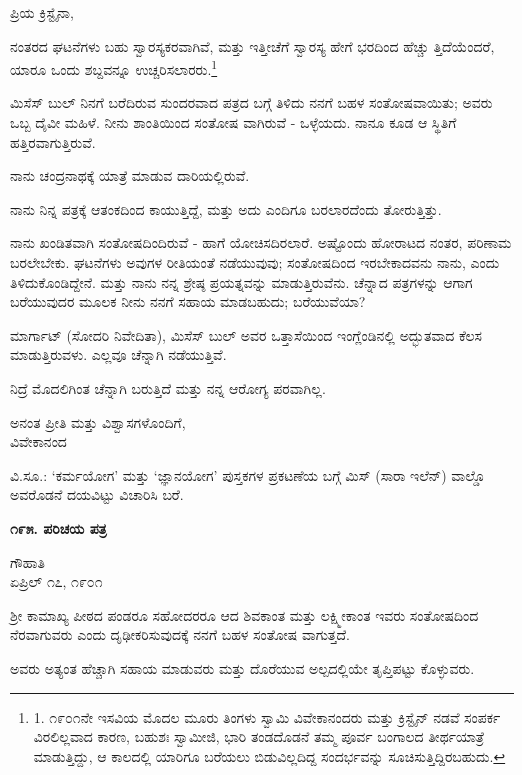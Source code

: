 ಪ್ರಿಯ ಕ್ರಿಸ್ಟೈನಾ,

ನಂತರದ ಘಟನೆಗಳು ಬಹು ಸ್ವಾರಸ್ಯಕರವಾಗಿವೆ, ಮತ್ತು ಇತ್ತೀಚೆಗೆ ಸ್ವಾರಸ್ಯ ಹೇಗೆ ಭರದಿಂದ ಹೆಚ್ಚು ತ್ತಿದೆಯೆಂದರೆ, ಯಾರೂ ಒಂದು ಶಬ್ದವನ್ನೂ ಉಚ್ಚರಿಸಲಾರರು.\footnote{1. ೧೯೦೧ನೇ ಇಸವಿಯ ಮೊದಲ ಮೂರು ತಿಂಗಳು ಸ್ವಾಮಿ ವಿವೇಕಾನಂದರು ಮತ್ತು ಕ್ರಿಸ್ಟೈನ್ ನಡವೆ ಸಂಪರ್ಕ ವಿರಲಿಲ್ಲವಾದ ಕಾರಣ, ಬಹುಶಃ ಸ್ವಾಮೀಜಿ, ಭಾರಿ ತಂಡದೊಡನೆ ತಮ್ಮ ಪೂರ್ವ ಬಂಗಾಲದ ತೀರ್ಥಯಾತ್ರೆ ಮಾಡುತ್ತಿದ್ದು, ಆ ಕಾಲದಲ್ಲಿ ಯಾರಿಗೂ ಬರೆಯಲು ಬಿಡುವಿಲ್ಲದಿದ್ದ ಸಂದರ್ಭವನ್ನು ಸೂಚಿಸುತ್ತಿದ್ದಿರಬಹುದು.}

ಮಿಸೆಸ್ ಬುಲ್ ನಿನಗೆ ಬರೆದಿರುವ ಸುಂದರವಾದ ಪತ್ರದ ಬಗ್ಗೆ ತಿಳಿದು ನನಗೆ ಬಹಳ ಸಂತೋಷವಾಯಿತು; ಅವರು ಒಬ್ಬ ದೈವೀ ಮಹಿಳೆ. ನೀನು ಶಾಂತಿಯಿಂದ ಸಂತೋಷ ವಾಗಿರುವೆ - ಒಳ್ಳೆಯದು. ನಾನೂ ಕೂಡ ಆ ಸ್ಥಿತಿಗೆ ಹತ್ತಿರವಾಗುತ್ತಿರುವೆ.

ನಾನು ಚಂದ್ರನಾಥಕ್ಕೆ ಯಾತ್ರೆ ಮಾಡುವ ದಾರಿಯಲ್ಲಿರುವೆ.

ನಾನು ನಿನ್ನ ಪತ್ರಕ್ಕೆ ಆತಂಕದಿಂದ ಕಾಯುತ್ತಿದ್ದೆ, ಮತ್ತು ಅದು ಎಂದಿಗೂ ಬರಲಾರದೆಂದು ತೋರುತ್ತಿತ್ತು.

ನಾನು ಖಂಡಿತವಾಗಿ ಸಂತೋಷದಿಂದಿರುವೆ - ಹಾಗೆ ಯೋಚಿಸದಿರಲಾರೆ. ಅಷ್ಟೊಂದು ಹೋರಾಟದ ನಂತರ, ಪರಿಣಾಮ ಬರಲೇಬೇಕು. ಘಟನೆಗಳು ಅವುಗಳ ರೀತಿಯಂತೆ ನಡೆಯುವುವು; ಸಂತೋಷದಿಂದ ಇರಬೇಕಾದವನು ನಾನು, ಎಂದು ತಿಳಿದುಕೊಂಡಿದ್ದೇನೆ. ಮತ್ತು ನಾನು ನನ್ನ ಶ್ರೇಷ್ಠ ಪ್ರಯತ್ನವನ್ನು ಮಾಡುತ್ತಿರುವೆನು. ಚೆನ್ನಾದ ಪತ್ರಗಳನ್ನು ಆಗಾಗ ಬರೆಯುವುದರ ಮೂಲಕ ನೀನು ನನಗೆ ಸಹಾಯ ಮಾಡಬಹುದು; ಬರೆಯುವೆಯಾ?

ಮಾರ್ಗಾಟ್ (ಸೋದರಿ ನಿವೇದಿತಾ), ಮಿಸೆಸ್ ಬುಲ್ ಅವರ ಒತ್ತಾಸೆಯಿಂದ ಇಂಗ್ಲೆಂಡಿನಲ್ಲಿ ಅದ್ಭುತವಾದ ಕೆಲಸ ಮಾಡುತ್ತಿರುವಳು. ಎಲ್ಲವೂ ಚೆನ್ನಾಗಿ ನಡೆಯುತ್ತಿವೆ.

ನಿದ್ರೆ ಮೊದಲಿಗಿಂತ ಚೆನ್ನಾಗಿ ಬರುತ್ತಿದೆ ಮತ್ತು ನನ್ನ ಆರೋಗ್ಯ ಪರವಾಗಿಲ್ಲ.

\begin{flushright}
ಅನಂತ ಪ್ರೀತಿ ಮತ್ತು ವಿಶ್ವಾಸಗಳೊಂದಿಗೆ,\\ವಿವೇಕಾನಂದ
\end{flushright}

ವಿ.ಸೂ.: ‘ಕರ್ಮಯೋಗ’ ಮತ್ತು ‘ಜ್ಞಾನಯೋಗ’ ಪುಸ್ತಕಗಳ ಪ್ರಕಟಣೆಯ ಬಗ್ಗೆ ಮಿಸ್ (ಸಾರಾ ಇಲೆನ್) ವಾಲ್ಡೊ ಅವರೊಡನೆ ದಯವಿಟ್ಟು ವಿಚಾರಿಸಿ ಬರೆ.

\begin{center}
\textbf{೧೯೫. ಪರಿಚಯ ಪತ್ರ}
\end{center}

\begin{flushright}
ಗೌಹಾತಿ\\ಏಪ್ರಿಲ್ ೧೭, ೧೯೦೧
\end{flushright}

ಶ‍್ರೀ ಕಾಮಾಖ್ಯ ಪೀಠದ ಪಂಡರೂ ಸಹೋದರರೂ ಆದ ಶಿವಕಾಂತ ಮತ್ತು ಲಕ್ಷ್ಮೀಕಾಂತ ಇವರು ಸಂತೋಷದಿಂದ ನೆರವಾಗುವರು ಎಂದು ದೃಢೀಕರಿಸುವುದಕ್ಕೆ ನನಗೆ ಬಹಳ ಸಂತೋಷ ವಾಗುತ್ತದೆ.

ಅವರು ಅತ್ಯಂತ ಹೆಚ್ಚಾಗಿ ಸಹಾಯ ಮಾಡುವರು ಮತ್ತು ದೊರೆಯುವ ಅಲ್ಪದಲ್ಲಿಯೇ ತೃಪ್ತಿಪಟ್ಟು ಕೊಳ್ಳುವರು.

